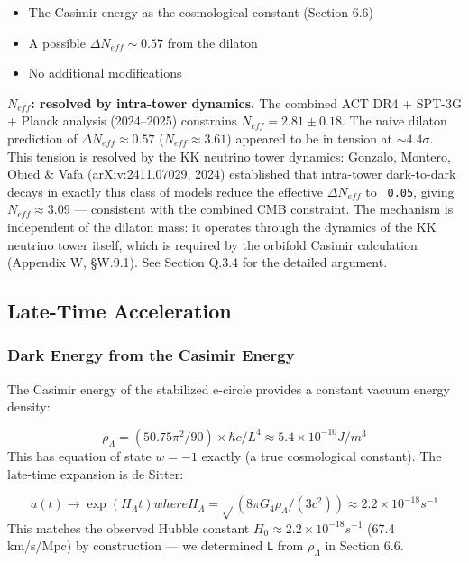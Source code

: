 \documentclass[aps,prd,preprint,superscriptaddress,longbibliography,floatfix]{revtex4-2}
\theoremstyle{remark}
\begin{document}
\begin{itemize}
  \item The Casimir energy as the cosmological constant (Section 6.6)
  \item A possible $\Delta N_{eff} \sim  0.57$ from the dilaton
  \item No additional modifications
\end{itemize}

\textbf{$N_{eff}$: resolved by intra-tower dynamics.} The combined ACT DR4 + SPT-3G + Planck analysis (2024--2025) constrains $N_{eff} = 2.81 \pm 0.18$. The naive dilaton prediction of $\Delta N_{eff} \approx 0.57$ ($N_{eff} \approx 3.61$) appeared to be in tension at $\sim 4.4\sigma$. This tension is resolved by the KK neutrino tower dynamics: Gonzalo, Montero, Obied \& Vafa (arXiv:2411.07029, 2024) established that intra-tower dark-to-dark decays in exactly this class of models reduce the effective $\Delta N_{eff}$ to \texttt{~0.05}, giving $N_{eff} \approx 3.09$ --- consistent with the combined CMB constraint. The mechanism is independent of the dilaton mass: it operates through the dynamics of the KK neutrino tower itself, which is required by the orbifold Casimir calculation (Appendix W, \S{}W.9.1). See Section Q.3.4 for the detailed argument.



\subsection{Late-Time Acceleration}


\subsubsection{Dark Energy from the Casimir Energy}

The Casimir energy of the stabilized e-circle provides a constant vacuum energy density:


\begin{equation}
    \rho_\Lambda = (50.75 \pi^{2}/90) \times \hbar c/L^{4} \approx 5.4 \times 10^{-10} J/m^{3}
\end{equation}
This has equation of state $w = -1$ exactly (a true cosmological constant). The late-time expansion is de Sitter:


\begin{equation}
    a(t) \to \exp(H_\Lambda t) where H_\Lambda = \sqrt{}(8\pi G_{4}\rho_\Lambda/(3c^{2})) \approx 2.2 \times 10^{-18} s^{-1}
\end{equation}
This matches the observed Hubble constant $H_{0} \approx 2.2 \times 10^{-18} s^{-1}$ (67.4 km/s/Mpc) by construction --- we determined \texttt{L} from $\rho_\Lambda$ in Section 6.6.
\end{document}
